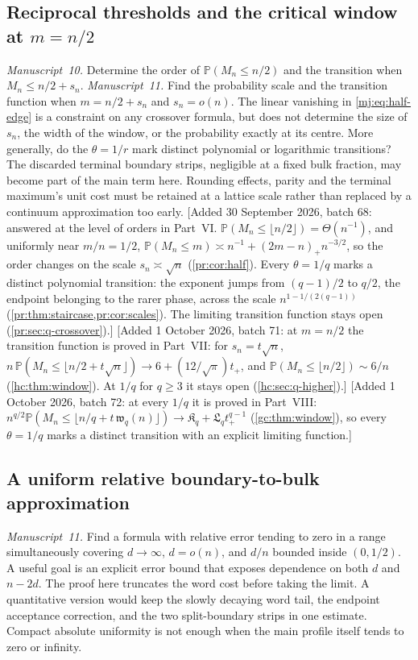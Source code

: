 \documentclass[11pt,a4paper]{article}
\theoremstyle{definition}\newaliascnt{definition}{theorem}
\theoremstyle{remark}\newaliascnt{remark}{theorem}
\newcommand{\ljP}{\mathbb P}
\begin{document}
\subsection{Reciprocal thresholds and the critical window at \texorpdfstring{$m=n/2$}{m = n/2}}
\label{cjm:sec:mj-half}
\emph{Manuscript~10.} Determine the order of $\ljP(M_n\le n/2)$ and the
transition when $M_n\le n/2+s_n$. \emph{Manuscript~11.} Find the probability
scale and the transition function when $m=n/2+s_n$ and $s_n=o(n)$. The linear
vanishing in \eqref{mj:eq:half-edge} is a constraint on any crossover formula,
but does not determine the size of $s_n$, the width of the window, or the
probability exactly at its centre. More generally, do the $\theta=1/r$ mark
distinct polynomial or logarithmic transitions? The discarded terminal
boundary strips, negligible at a fixed bulk fraction, may become part of the
main term here. Rounding effects, parity and the terminal maximum's unit cost
must be retained at a lattice scale rather than replaced by a continuum
approximation too early.
[Added 30 September 2026, batch 68: answered at the level of orders in
Part~VI. $\ljP(M_n\le\lfloor n/2\rfloor)=\Theta(n^{-1})$, and uniformly near
$m/n=1/2$, $\ljP(M_n\le m)\asymp n^{-1}+(2m-n)_+n^{-3/2}$, so the order
changes on the scale $s_n\asymp\sqrt n$ (\cref{pr:cor:half}). Every
$\theta=1/q$ marks a distinct polynomial transition: the exponent jumps from
$(q-1)/2$ to $q/2$, the endpoint belonging to the rarer phase, across the
scale $n^{1-1/(2(q-1))}$ (\cref{pr:thm:staircase,pr:cor:scales}). The
limiting transition function stays open (\cref{pr:sec:q-crossover}).]
[Added 1 October 2026, batch 71: at $m=n/2$ the transition function is
proved in Part~VII: for $s_n=t\sqrt n$,
$n\,\ljP(M_n\le\lfloor n/2+t\sqrt n\rfloor)\to6+(12/\sqrt\pi)t_+$, and
$\ljP(M_n\le\lfloor n/2\rfloor)\sim6/n$ (\cref{hc:thm:window}). At $1/q$ for
$q\ge3$ it stays open (\cref{hc:sec:q-higher}).]
[Added 1 October 2026, batch 72: at every $1/q$ it is proved in Part~VIII:
$n^{q/2}\ljP(M_n\le\lfloor n/q+t\,\mathfrak w_q(n)\rfloor)\to
\mathfrak K_q+\mathfrak L_qt_+^{q-1}$ (\cref{gc:thm:window}), so every
$\theta=1/q$ marks a distinct transition with an explicit limiting function.]

\subsection{A uniform relative boundary-to-bulk approximation}
\emph{Manuscript~11.} Find a formula with relative error tending to zero in a
range simultaneously covering $d\to\infty$, $d=o(n)$, and $d/n$ bounded
inside $(0,1/2)$. A useful goal is an explicit error bound that exposes
dependence on both $d$ and $n-2d$. The proof here truncates the word cost
before taking the limit. A quantitative version would keep the slowly
decaying word tail, the endpoint acceptance correction, and the two
split-boundary strips in one estimate. Compact absolute uniformity is not
enough when the main profile itself tends to zero or infinity.
\end{document}
